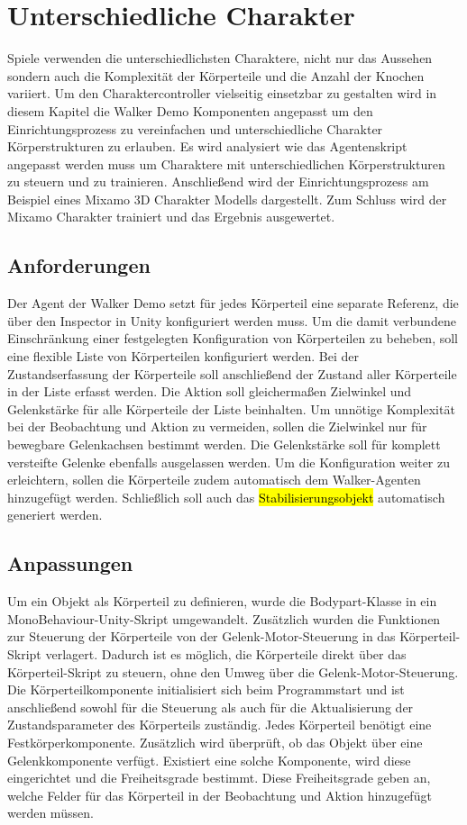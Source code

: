 \section{Unterschiedliche Charakter}
Spiele verwenden die unterschiedlichsten Charaktere, nicht nur das Aussehen sondern auch die Komplexität der Körperteile und die Anzahl der Knochen variiert. Um den Charaktercontroller vielseitig einsetzbar zu gestalten wird in diesem Kapitel die Walker Demo Komponenten angepasst um den Einrichtungsprozess zu vereinfachen und unterschiedliche Charakter Körperstrukturen zu erlauben. Es wird analysiert wie das Agentenskript angepasst werden muss um Charaktere mit unterschiedlichen Körperstrukturen zu steuern und zu trainieren. Anschließend wird der Einrichtungsprozess am Beispiel eines Mixamo 3D Charakter Modells dargestellt. Zum Schluss wird der Mixamo Charakter trainiert und das Ergebnis ausgewertet.

\subsection{Anforderungen}	
Der Agent der Walker Demo setzt für jedes Körperteil eine separate Referenz, die über den Inspector in Unity konfiguriert werden muss. Um die damit verbundene Einschränkung einer festgelegten Konfiguration von Körperteilen zu beheben, soll eine flexible Liste von Körperteilen konfiguriert werden. Bei der Zustandserfassung der Körperteile soll anschließend der Zustand aller Körperteile in der Liste erfasst werden. Die Aktion soll gleichermaßen Zielwinkel und Gelenkstärke für alle Körperteile der Liste beinhalten. Um unnötige Komplexität bei der Beobachtung und Aktion zu vermeiden, sollen die Zielwinkel nur für bewegbare Gelenkachsen bestimmt werden. Die Gelenkstärke soll für komplett versteifte Gelenke ebenfalls ausgelassen werden. Um die Konfiguration weiter zu erleichtern, sollen die Körperteile zudem automatisch dem Walker-Agenten hinzugefügt werden. Schließlich soll auch das \hl{Stabilisierungsobjekt} automatisch generiert werden.

\subsection{Anpassungen}
Um ein Objekt als Körperteil zu definieren, wurde die Bodypart-Klasse in ein MonoBehaviour-Unity-Skript umgewandelt. Zusätzlich wurden die Funktionen zur Steuerung der Körperteile von der Gelenk-Motor-Steuerung in das Körperteil-Skript verlagert. Dadurch ist es möglich, die Körperteile direkt über das Körperteil-Skript zu steuern, ohne den Umweg über die Gelenk-Motor-Steuerung. Die Körperteilkomponente initialisiert sich beim Programmstart und ist anschließend sowohl für die Steuerung als auch für die Aktualisierung der Zustandsparameter des Körperteils zuständig. Jedes Körperteil benötigt eine Festkörperkomponente. Zusätzlich wird überprüft, ob das Objekt über eine Gelenkkomponente verfügt. Existiert eine solche Komponente, wird diese eingerichtet und die Freiheitsgrade bestimmt. Diese Freiheitsgrade geben an, welche Felder für das Körperteil in der Beobachtung und Aktion hinzugefügt werden müssen.

